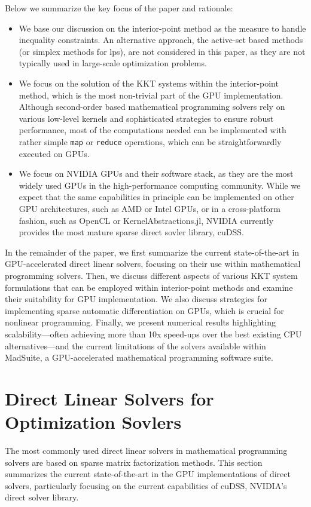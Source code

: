 \documentclass{article}
\begin{document}
Below we summarize the key focus of the paper and rationale:
\begin{itemize}[leftmargin=*,itemsep=0pt,parsep=0pt,partopsep=0pt]
\item We base our discussion on the interior-point method as the measure to handle inequality constraints. An alternative approach, the active-set based methods (or simplex methods for \glspl*{lp}), are not considered in this paper, as they are not typically used in large-scale optimization problems.
\item We focus on the solution of the KKT systems within the interior-point method, which is the most non-trivial part of the GPU implementation. Although second-order based mathematical programming solvers rely on various low-level kernels and sophisticated strategies to ensure robust performance, most of the computations needed can be implemented with rather simple \texttt{map} or \texttt{reduce} operations, which can be straightforwardly executed on GPUs.
\item We focus on NVIDIA GPUs and their software stack, as they are the most widely used GPUs in the high-performance computing community. While we expect that the same capabilities in principle can be implemented on other GPU architectures, such as AMD or Intel GPUs, or in a cross-platform fashion, such as OpenCL or KernelAbstractions.jl, NVIDIA currently provides the most mature sparse direct sovler library, cuDSS.
\end{itemize}
In the remainder of the paper, we first summarize the current state-of-the-art in GPU-accelerated direct linear solvers, focusing on their use within mathematical programming solvers.
Then, we discuss different aspects of various KKT system formulations that can be employed within interior-point methods and examine their suitability for GPU implementation.
We also discuss strategies for implementing sparse automatic differentiation on GPUs, which is crucial for nonlinear programming.
Finally, we present numerical results highlighting scalability---often achieving more than 10x speed-ups over the best existing CPU alternatives---and the current limitations of the solvers available within MadSuite, a GPU-accelerated mathematical programming software suite.

\section{Direct Linear Solvers for Optimization Sovlers}\label{eqn:linear}
The most commonly used direct linear solvers in mathematical programming solvers are based on sparse matrix factorization methods.
This section summarizes the current state-of-the-art in the GPU implementations of direct solvers, particularly focusing on the current capabilities of cuDSS, NVIDIA's direct solver library.
\end{document}
